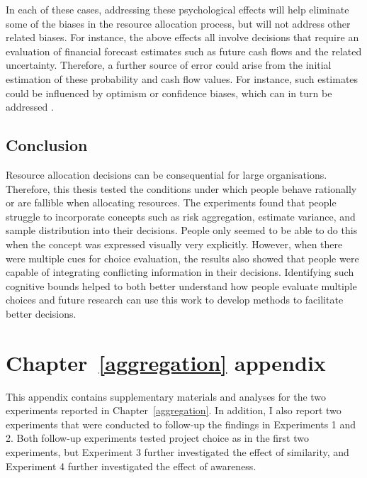 \documentclass[a4paper, nobind, dvipsnames]{templates/ociamthesis}
\theoremstyle{definition}
\theoremstyle{definition}
\theoremstyle{definition}
\theoremstyle{definition}
\theoremstyle{remark}
\begin{document}
In each of these cases, addressing these psychological effects will help
eliminate some of the biases in the resource allocation process, but will not
address other related biases. For instance, the above effects all involve
decisions that require an evaluation of financial forecast estimates such as
future cash flows and the related uncertainty. Therefore, a further source of
error could arise from the initial estimation of these probability and cash flow
values. For instance, such estimates could be influenced by optimism or
confidence biases, which can in turn be addressed \autocite{flyvbjerg2018}.

\hypertarget{conclusion}{%
\section{Conclusion}\label{conclusion}}

Resource allocation decisions can be consequential for large organisations.
Therefore, this thesis tested the conditions under which people behave
rationally or are fallible when allocating resources. The experiments found that
people struggle to incorporate concepts such as risk aggregation, estimate
variance, and sample distribution into their decisions. People only seemed to be
able to do this when the concept was expressed visually very explicitly.
However, when there were multiple cues for choice evaluation, the results also
showed that people were capable of integrating conflicting information in their
decisions. Identifying such cognitive bounds helped to both better understand
how people evaluate multiple choices and future research can use this work to
develop methods to facilitate better decisions.

\newpage

\printbibliography[segment=\therefsegment,heading=subbibintoc]

\hypertarget{appendix-appendix}{%
\appendix}


\hypertarget{aggregation-appendix}{%
\chapter{Chapter~\ref{aggregation} appendix}\label{aggregation-appendix}}

\minitoc

This appendix contains supplementary materials and analyses for the two
experiments reported in Chapter~\ref{aggregation}. In addition, I also report
two experiments that were conducted to follow-up the findings in Experiments 1
and 2. Both follow-up experiments tested project choice as in the first two
experiments, but Experiment 3 further investigated the effect of similarity, and
Experiment 4 further investigated the effect of awareness.
\end{document}
